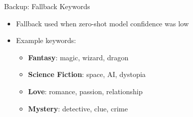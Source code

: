\begin{frame}{Backup: Fallback Keywords}

\begin{itemize}
    \item Fallback used when zero-shot model confidence was low
    \item Example keywords:
    \begin{itemize}
        \item \textbf{Fantasy}: magic, wizard, dragon
        \item \textbf{Science Fiction}: space, AI, dystopia
        \item \textbf{Love}: romance, passion, relationship
        \item \textbf{Mystery}: detective, clue, crime
    \end{itemize}
\end{itemize}

\end{frame}
